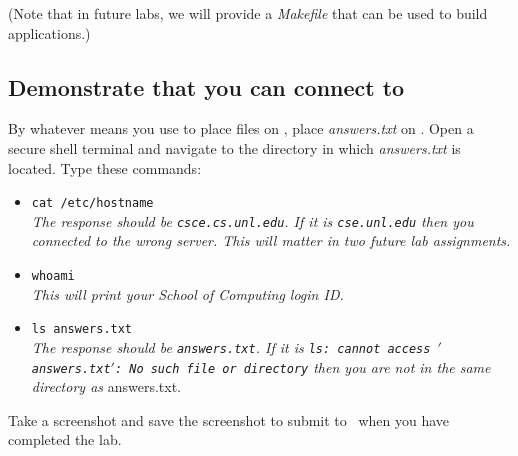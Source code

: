 (Note that in future labs, we will provide a \textit{Makefile} that can be used to build applications.)

\subsection*{Demonstrate that you can connect to \runtimeenvironment}

By whatever means you use to place files on \runtimeenvironment, place \textit{answers.txt} on \runtimeenvironment.
Open a secure shell terminal and navigate to the directory in which \textit{answers.txt} is located.
Type these commands:
\begin{itemize}
    \item[]\texttt{cat /etc/hostname} \\
    \textit{The response should be \texttt{csce.cs.unl.edu}.                %
    If it is \texttt{cse.unl.edu} then you connected to the wrong server.   %
    This will matter in two future lab assignments.}
    \item[]\texttt{whoami} \\
    \textit{This will print your School of Computing login ID.}
    \item[]\texttt{ls answers.txt} \\
    \textit{The response should be \texttt{answers.txt}.
    If it is \texttt{ls: cannot access $'$answers.txt$'$: No such file or directory} then you are not in the same directory as} answers.txt.
\end{itemize}

Take a screenshot and save the screenshot to submit to \filesubmission\ when you have completed the lab.
